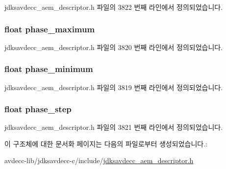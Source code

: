 jdksavdecc\+\_\+aem\+\_\+descriptor.\+h 파일의 3822 번째 라인에서 정의되었습니다.

\subsubsection[{\texorpdfstring{phase\+\_\+maximum}{phase_maximum}}]{\setlength{\rightskip}{0pt plus 5cm}float phase\+\_\+maximum}\hypertarget{structjdksavdecc__values__bode__plot_a5dfca76f4af2509da81aa5658afae11c}{}\label{structjdksavdecc__values__bode__plot_a5dfca76f4af2509da81aa5658afae11c}


jdksavdecc\+\_\+aem\+\_\+descriptor.\+h 파일의 3820 번째 라인에서 정의되었습니다.

\subsubsection[{\texorpdfstring{phase\+\_\+minimum}{phase_minimum}}]{\setlength{\rightskip}{0pt plus 5cm}float phase\+\_\+minimum}\hypertarget{structjdksavdecc__values__bode__plot_a8e404eb68fb24ec7bc16daaf6f826c3a}{}\label{structjdksavdecc__values__bode__plot_a8e404eb68fb24ec7bc16daaf6f826c3a}


jdksavdecc\+\_\+aem\+\_\+descriptor.\+h 파일의 3819 번째 라인에서 정의되었습니다.

\subsubsection[{\texorpdfstring{phase\+\_\+step}{phase_step}}]{\setlength{\rightskip}{0pt plus 5cm}float phase\+\_\+step}\hypertarget{structjdksavdecc__values__bode__plot_af6b595fa87a001625f4cd8f0c5a4611c}{}\label{structjdksavdecc__values__bode__plot_af6b595fa87a001625f4cd8f0c5a4611c}


jdksavdecc\+\_\+aem\+\_\+descriptor.\+h 파일의 3821 번째 라인에서 정의되었습니다.



이 구조체에 대한 문서화 페이지는 다음의 파일로부터 생성되었습니다.\+:\begin{DoxyCompactItemize}
\item 
avdecc-\/lib/jdksavdecc-\/c/include/\hyperlink{jdksavdecc__aem__descriptor_8h}{jdksavdecc\+\_\+aem\+\_\+descriptor.\+h}\end{DoxyCompactItemize}
